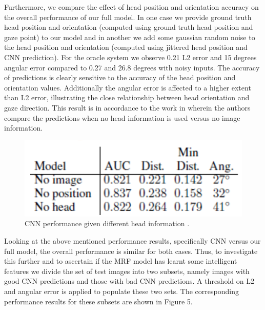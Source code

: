 \documentclass[10pt,twocolumn,letterpaper]{article}
\begin{document}
Furthermore, we compare the effect of head position and orientation accuracy on the overall performance of our full model. In one case we provide ground truth head position and orientation (computed using ground truth head position and gaze point) to our model and in another we add some gaussian random noise to the head position and orientation (computed using jittered head position and CNN prediction). For the oracle system we observe 0.21 L2 error and 15 degrees angular error compared to 0.27 and 26.8 degrees with noisy inputs. The accuracy of predictions is clearly sensitive to the accuracy of the head position and orientation values. Additionally the angular error is affected to a higher extent than L2 error, illustrating the close relationship between head orientation and gaze direction. This result is in accordance to the work in \cite{nips15_recasens} wherein the authors compare the predictions when no head information is used versus no image information.

\begin{figure}[H]
  \begin{center}
    \includegraphics[width=0.75\linewidth]{images/head_table.png}
  \end{center}
  \vspace{-0.3cm}
   \caption{CNN performance given different head information \cite{nips15_recasens}.}
  \vspace{-0.5cm}
\end{figure}

\vspace{3ex}
Looking at the above mentioned performance results, specifically CNN versus our full model, the overall performance is similar for both cases. Thus, to investigate this further and to ascertain if the MRF model has learnt some intelligent features we divide the set of test images into two subsets, namely images with good CNN predictions and those with bad CNN predictions. A threshold on L2 and angular error is applied to populate these two sets. The corresponding performance results for these subsets are shown in Figure 5.
\end{document}
